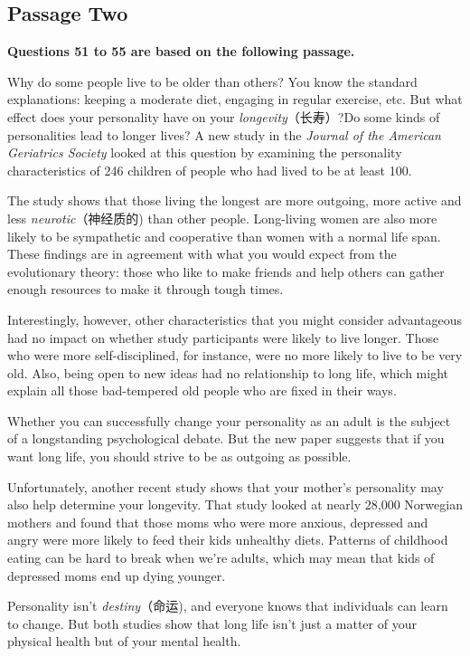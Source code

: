 \documentclass[UTF8,11pt]{ctexart}
\begin{document}
\subsection*{\textbf{Passage Two}}


\textbf{Questions 51 to 55 are based on the following passage.}


Why do some people live to be older than others? You know the standard explanations: keeping a moderate diet, engaging in regular exercise, etc. But what effect does your personality have on your\textit{ longevity}（长寿）?Do some kinds of personalities lead to longer lives? A new study in the\textit{ Journal of the American Geriatrics Society} looked at this question by examining the personality characteristics of 246 children of people who had lived to be at least 100.


The study shows that those living the longest are more outgoing, more active and less\textit{ neurotic}（神经质的) than other people. Long-living women are also more likely to be sympathetic and cooperative than women with a normal life span. These findings are in agreement with what you would expect from the evolutionary theory: those who like to make friends and help others can gather enough resources to make it through tough times.


Interestingly, however, other characteristics that you might consider advantageous had no impact on whether study participants were likely to live longer. Those who were more self-disciplined, for instance, were no more likely to live to be very old. Also, being open to new ideas had no relationship to long life, which might explain all those bad-tempered old people who are fixed in their ways.


Whether you can successfully change your personality as an adult is the subject of a longstanding psychological debate. But the new paper suggests that if you want long life, you should strive to be as outgoing as possible.


Unfortunately, another recent study shows that your mother's personality may also help determine your longevity. That study looked at nearly 28,000 Norwegian mothers and found that those moms who were more anxious, depressed and angry were more likely to feed their kids unhealthy diets. Patterns of childhood eating can be hard to break when we're adults, which may mean that kids of depressed moms end up dying younger.


Personality isn't\textit{ destiny}（命运), and everyone knows that individuals can learn to change. But both studies show that long life isn't just a matter of your physical health but of your mental health.
\end{document}
